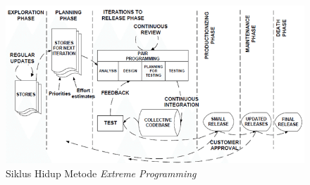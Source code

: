 \begin{figure}[ht]
    \includegraphics[width=1\linewidth, center]{images/tinjauan-pustaka/fig-xp-lifecycle.png}
    \caption{Siklus Hidup Metode \textit{Extreme Programming} \parencite{article:anwer}}
    \label{fig:xp-lifecycle}
\end{figure}


